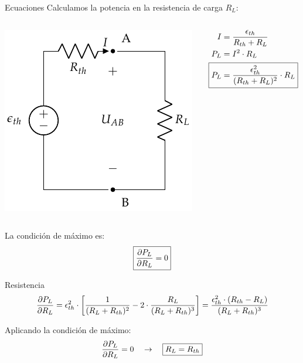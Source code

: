 \documentclass[aspectratio=169, xcolor={usenames,svgnames,dvipsnames}]{beamer}
\begin{document}
\begin{frame}{Ecuaciones}
    \vspace{2mm}
    Calculamos la \alert{potencia en la resistencia} de carga \(R_L\):
    \begin{columns}
    \begin{column}{0.45\columnwidth}
    \begin{center}
    \includegraphics[height=0.45\textheight]{../figs/EquivalenteThevenin0_R.pdf}
    \end{center}
    \end{column}
    
    \begin{column}{0.45\columnwidth}
    \begin{align*}
    I &= \frac{\epsilon_{th}}{R_{th} + R_L}\\
    P_L &= I^2 \cdot R_L\\
    \Aboxed{P_L &= \frac{\epsilon^2_{th}}{(R_{th} + R_L)^2} \cdot R_L}
    \end{align*}
    \end{column}
    \end{columns}

    \vspace{5mm}
    La \alert{condición de máximo} es:
    \[
      \boxed{%
        \diffp{P_L}{R_L} = 0%
      }
    \]
\end{frame}


\begin{frame}{Resistencia}
    \begin{equation*}
        \diffp{P_L}{R_L} = \epsilon^2_{th} \cdot \left[\frac{1}{(R_L + R_{th})^2} - 2 \cdot \frac{R_L}{(R_L + R_{th})^3}\right]= \frac{\epsilon^2_{th} \cdot (R_{th} - R_L)}{(R_L + R_{th})^3}
    \end{equation*}

    \vspace{5mm}
    Aplicando la \alert{condición de máximo}:
    \[
       \diffp{P_L}{R_L} = 0 \quad \rightarrow \quad \boxed{R_L = R_{th}}
    \]
\end{frame}
\end{document}
